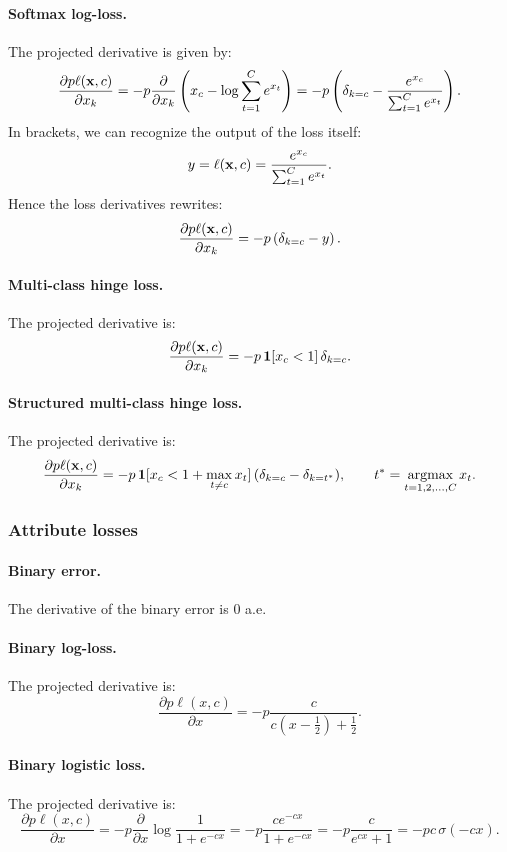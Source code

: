 \paragraph{Softmax log-loss.} The projected derivative is given by:
\[
\frac{\partial p \ell(\mathbf{x},c)}{\partial x_k}
=
- p \frac{\partial}{\partial x_k}
\left(x_c - \log \sum_{t=1}^C e^{x_t}\right)
=
- p \left(\delta_{k=c} - \frac{e^{x_c}}{\sum_{t=1}^C e^{x_t}} \right).
\]
In brackets, we can recognize the output of the loss itself:
\[
y = \ell(\mathbf{x},c) = \frac{e^{x_c}}{\sum_{t=1}^C e^{x_t}}.
\]
Hence the loss derivatives rewrites:
\[
\frac{\partial p \ell(\mathbf{x},c)}{\partial x_k}
=
- p \left(\delta_{k=c} - y \right).
\]

\paragraph{Multi-class hinge loss.} The projected derivative is:
\[
\frac{\partial p \ell(\mathbf{x},c)}{\partial x_k}
=
- p\,\mathbf{1}[x_c < 1]\,\delta_{k=c}.
\]

\paragraph{Structured multi-class hinge loss.} The projected derivative is:
\[
\frac{\partial p \ell(\bx,c)}{\partial x_k}
=
- p\,\mathbf{1}[x_c < 1 + \max_{t\not= c} x_t]\,(\delta_{k=c} - \delta_{k=t^*}),
\qquad
t^* = \argmax_{t =1,2,\dots,C} x_t.
\]

\subsubsection{Attribute losses}\label{s:impl-loss-attribute}

\paragraph{Binary error.} The derivative of the binary error is 0 a.e.

\paragraph{Binary log-loss.} The projected derivative is:
\[
\frac{\partial p \ell(x,c)}{\partial x}
=
- p \frac{c}{c \left(x - \frac{1}{2}\right) + \frac{1}{2}}.
\]

\paragraph{Binary logistic loss.} The projected derivative is:
\[
\frac{\partial p \ell(x,c)}{\partial x}
=
- p \frac{\partial}{\partial x} \log \frac{1}{1+e^{-cx}}
=
- p \frac{c e^{-cx}}{1 + e^{-cx}}
=
- p \frac{c}{e^{cx} + 1}
=
- pc\, \sigma(-cx).
\]

